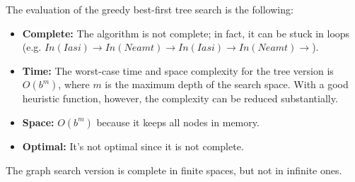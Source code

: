 The evaluation of the greedy best-first tree search is the following:
\begin{itemize}
    \item \textbf{Complete:} The algorithm is not complete; in fact, it can be stuck in loops (e.g. $In(Iasi) \rightarrow In(Neamt) \rightarrow In(Iasi) \rightarrow In(Neamt) \rightarrow$).

    \item \textbf{Time:} The worst-case time and space complexity for the tree version is $O(b^m)$,  where $m$ is the maximum depth of the search space. With a good heuristic function, however, the complexity can be reduced substantially.

    \item \textbf{Space:} $O(b^m)$ because it keeps all nodes in memory.

    \item \textbf{Optimal:} It's not optimal since it is not complete.
\end{itemize}
The graph search version is complete in finite spaces, but not in infinite ones.

